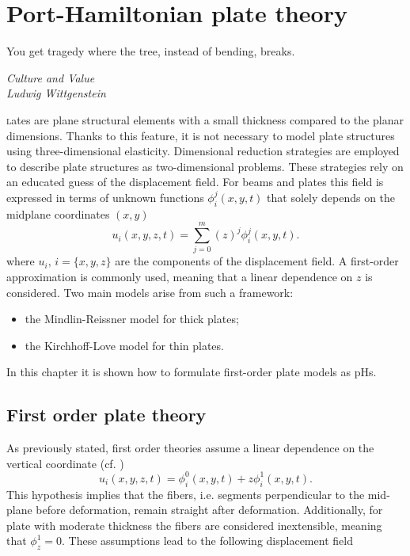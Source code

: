 \chapter{Port-Hamiltonian plate theory}

\epigraph{You get tragedy where the tree, instead of bending, breaks.}{\textit{Culture and Value\\
Ludwig Wittgenstein}}
\minitoc

\lettrine{\color{theme}{P}}lates are plane structural elements with a small thickness compared to the planar dimensions. Thanks to this feature, it is not necessary to model plate structures using three-dimensional elasticity. Dimensional reduction strategies are employed to describe plate structures as two-dimensional problems. These strategies rely on an educated guess of the displacement field. For beams and plates this field is expressed in terms of unknown functions $\phi_i^j(x,y,t)$ that solely depends on the midplane coordinates $(x,y)$
\begin{equation*}
u_i(x,y,z,t) = \sum_{j=0}^m (z)^j \phi_i^j(x,y,t).
\end{equation*}
where $u_{i}, \, i = \{x, y, z\}$ are the components of the displacement field. A first-order approximation is commonly used, meaning that a linear dependence on $z$ is considered. Two main models arise from such a framework: 
\begin{itemize}
	\item the Mindlin-Reissner model for thick plates;
	\item the Kirchhoff-Love model for thin plates.
\end{itemize}

In this chapter it is shown how to formulate first-order plate models as pHs. 

\section{First order plate theory}
As previously stated, first order theories assume a linear dependence on the vertical coordinate (cf. \cite{reddy2006theory})
\begin{equation*}
u_i(x,y,z,t) = \phi_i^0(x,y,t) + z \phi_i^1(x,y,t).
\end{equation*}
This hypothesis implies that the fibers, i.e. segments perpendicular to the mid-plane before deformation, remain straight after deformation. Additionally, for plate with moderate thickness the fibers are considered inextensible, meaning that $\phi_z^1 = 0$. These assumptions lead to the following displacement field

